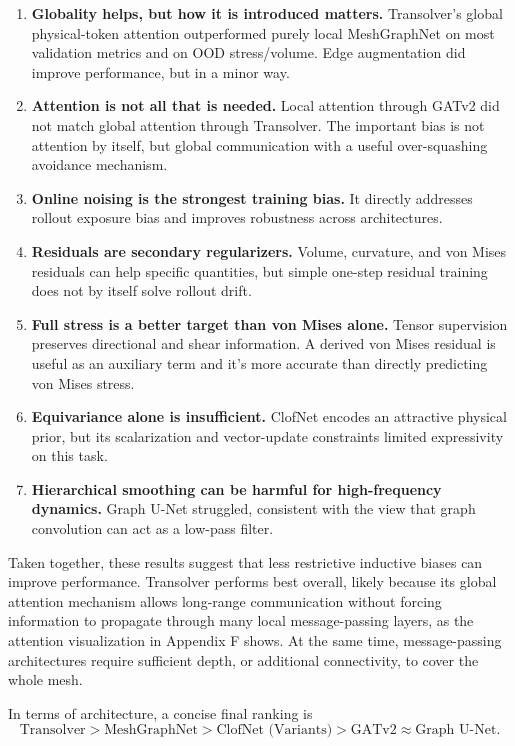 \documentclass[11pt,a4paper,reqno]{amsart}
\theoremstyle{definition}
\theoremstyle{remark}
\numberwithin{equation}{section}
\begin{document}
\begin{enumerate}[leftmargin=1.5em]
    \item \textbf{Globality helps, but how it is introduced matters.} Transolver's global physical-token attention outperformed purely local MeshGraphNet on most validation metrics and on OOD stress/volume. Edge augmentation did improve performance, but in a minor way.
    \item \textbf{Attention is not all that is needed.} Local attention through GATv2 did not match global attention through Transolver. The important bias is not attention by itself, but global communication with a useful over-squashing avoidance mechanism.
    \item \textbf{Online noising is the strongest training bias.} It directly addresses rollout exposure bias and improves robustness across architectures.
    \item \textbf{Residuals are secondary regularizers.} Volume, curvature, and von Mises residuals can help specific quantities, but simple one-step residual training does not by itself solve rollout drift.
    \item \textbf{Full stress is a better target than von Mises alone.} Tensor supervision preserves directional and shear information. A derived von Mises residual is useful as an auxiliary term and it's more accurate than directly predicting von Mises stress.
    \item \textbf{Equivariance alone is insufficient.} ClofNet encodes an attractive physical prior, but its scalarization and vector-update constraints limited expressivity on this task.
    \item \textbf{Hierarchical smoothing can be harmful for high-frequency dynamics.} Graph U-Net struggled, consistent with the view that graph convolution can act as a low-pass filter.
\end{enumerate}
\noindent
Taken together, these results suggest that less restrictive inductive biases can improve performance. Transolver performs best overall, likely because its global attention mechanism allows long-range communication without forcing information to propagate through many local message-passing layers, as the attention visualization in Appendix F shows. At the same time, message-passing architectures require sufficient depth, or additional connectivity, to cover the whole mesh.

In terms of architecture, a concise final ranking is
\begin{equation}
    \boxed{\text{Transolver} > \text{MeshGraphNet} > \text{ClofNet (Variants)} > \text{GATv2}\approx\text{Graph U-Net}.}
\end{equation}
\end{document}
